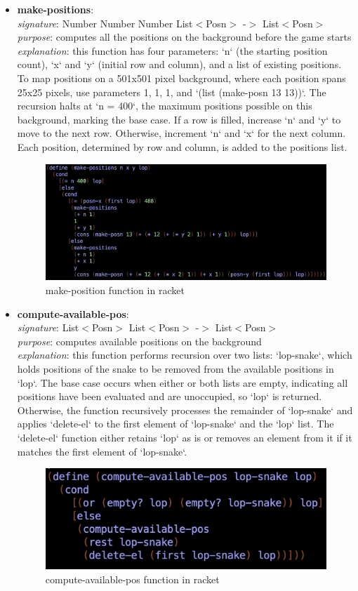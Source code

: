 \documentclass{article}
\begin{document}
	\begin{itemize}
		\item \textbf{make-positions}: \\
			\emph{signature}: Number Number Number List$<$Posn$>$ -$>$ List$<$Posn$>$ \\
			\emph{purpose}: computes all the positions on the background before the game starts \\
			\emph{explanation}: this function has four parameters: `n` (the starting position count), `x` and `y` (initial row and column), and a list of existing positions. To map positions on a 501x501 pixel background, where each position spans 25x25 pixels, use parameters 1, 1, 1, and `(list (make-posn 13 13))`. The recursion halts at `n = 400`, the maximum positions possible on this background, marking the base case. If a row is filled, increase `n` and `y` to move to the next row. Otherwise, increment `n` and `x` for the next column. Each position, determined by row and column, is added to the positions list.
			\begin{figure}[h!]
				\centering
				\includegraphics[width=.6\linewidth]{make-position.png}
				\caption{make-position function in racket}
			\end{figure}
			
		\item \textbf{compute-available-pos}: \\
			\emph{signature}: List$<$Posn$>$ List$<$Posn$>$ -$>$ List$<$Posn$>$ \\
			\emph{purpose}: computes available positions on the background \\
			\emph{explanation}: this function performs recursion over two lists: `lop-snake`, which holds positions of the snake to be removed from the available positions in `lop`. The base case occurs when either or both lists are empty, indicating all positions have been evaluated and are unoccupied, so `lop` is returned. Otherwise, the function recursively processes the remainder of `lop-snake` and applies `delete-el` to the first element of `lop-snake` and the `lop` list. The `delete-el` function either retains `lop` as is or removes an element from it if it matches the first element of `lop-snake`.
			\begin{figure}[h!]
				\centering
				\includegraphics[width=.6\linewidth]{compute-available-pos.png}
				\caption{compute-available-pos function in racket}
			\end{figure}
			

\end{itemize}
\end{document}
